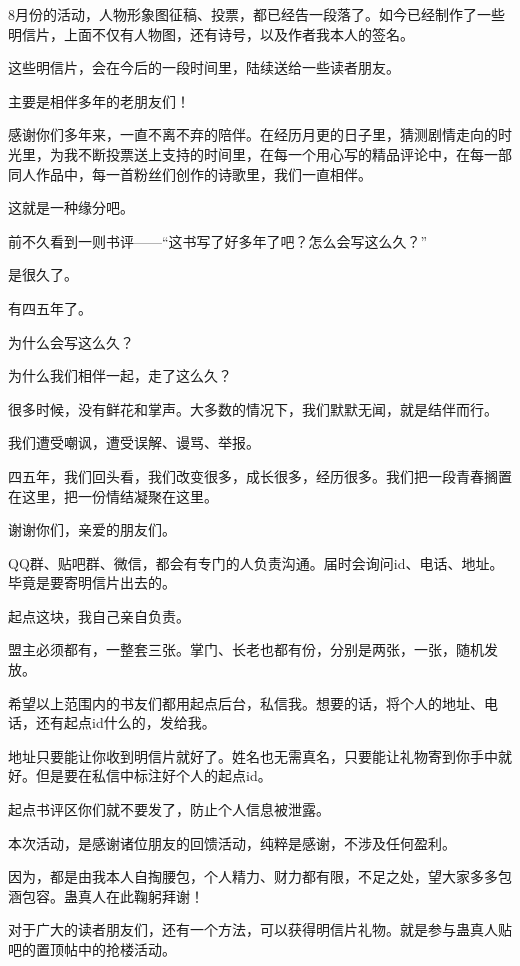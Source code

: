\begin{this_body}
8月份的活动，人物形象图征稿、投票，都已经告一段落了。如今已经制作了一些明信片，上面不仅有人物图，还有诗号，以及作者我本人的签名。

这些明信片，会在今后的一段时间里，陆续送给一些读者朋友。

主要是相伴多年的老朋友们！

感谢你们多年来，一直不离不弃的陪伴。在经历月更的日子里，猜测剧情走向的时光里，为我不断投票送上支持的时间里，在每一个用心写的精品评论中，在每一部同人作品中，每一首粉丝们创作的诗歌里，我们一直相伴。

这就是一种缘分吧。

前不久看到一则书评——“这书写了好多年了吧？怎么会写这么久？”

是很久了。

有四五年了。

为什么会写这么久？

为什么我们相伴一起，走了这么久？

很多时候，没有鲜花和掌声。大多数的情况下，我们默默无闻，就是结伴而行。

我们遭受嘲讽，遭受误解、谩骂、举报。

四五年，我们回头看，我们改变很多，成长很多，经历很多。我们把一段青春搁置在这里，把一份情结凝聚在这里。

谢谢你们，亲爱的朋友们。

QQ群、贴吧群、微信，都会有专门的人负责沟通。届时会询问id、电话、地址。毕竟是要寄明信片出去的。

起点这块，我自己亲自负责。

盟主必须都有，一整套三张。掌门、长老也都有份，分别是两张，一张，随机发放。

希望以上范围内的书友们都用起点后台，私信我。想要的话，将个人的地址、电话，还有起点id什么的，发给我。

地址只要能让你收到明信片就好了。姓名也无需真名，只要能让礼物寄到你手中就好。但是要在私信中标注好个人的起点id。

起点书评区你们就不要发了，防止个人信息被泄露。

本次活动，是感谢诸位朋友的回馈活动，纯粹是感谢，不涉及任何盈利。

因为，都是由我本人自掏腰包，个人精力、财力都有限，不足之处，望大家多多包涵包容。蛊真人在此鞠躬拜谢！

对于广大的读者朋友们，还有一个方法，可以获得明信片礼物。就是参与蛊真人贴吧的置顶帖中的抢楼活动。


\end{this_body}
